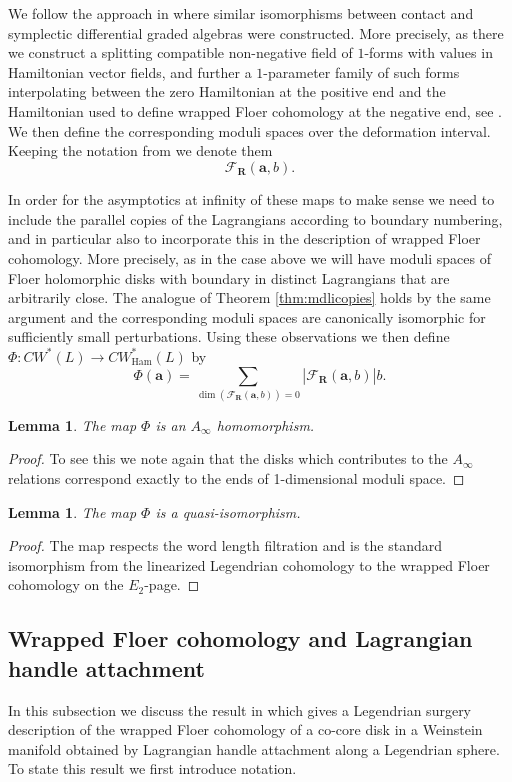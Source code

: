 \documentclass{gtpart}
\newtheorem{lem}[thm]{Lemma}
\renewcommand{\R}{\mathbf{R}}
\begin{document}
We follow the approach in \cite{EO} where similar isomorphisms between contact and
symplectic differential graded algebras were constructed. More precisely, as there we
construct a splitting compatible non-negative field of $1$-forms with values in Hamiltonian vector
fields, and further a $1$-parameter family of such forms interpolating between the zero Hamiltonian
at the positive end and the Hamiltonian used to define wrapped Floer cohomology at the negative end, see \cite[Section 2]{EO}. We then define the corresponding moduli spaces over the deformation interval. Keeping the notation from \cite{EO} we denote them
\[ 
\mathcal{F}_{\R}(\mathbf{a},b).
\]

In order for the asymptotics at infinity of these maps to make sense we need to include the
parallel copies of the Lagrangians according to boundary numbering, and in particular also to
incorporate this in the description of wrapped Floer cohomology. More precisely, as in the case above we will have moduli spaces of Floer holomorphic disks with boundary in distinct Lagrangians that are arbitrarily close. The analogue of Theorem \ref{thm:mdlicopies} holds by the same argument and the corresponding moduli spaces are canonically isomorphic for sufficiently small perturbations. Using these observations we then define $\Phi\colon CW^{\ast}(L)\to CW^{\ast}_{\mathrm{Ham}}(L)$ by
\[ 
\Phi(\mathbf{a})=\sum_{\dim(\mathcal{F}_{\R}(\mathbf{a},b))=0}|\mathcal{F}_{\R}(\mathbf{a},b)|b.
\]
\begin{lem}
The map $\Phi$ is an $A_{\infty}$ homomorphism.
\end{lem}

\begin{proof}
To see this we note again that the disks which contributes to the $A_{\infty}$ relations correspond exactly to the ends of 1-dimensional moduli space.
\end{proof}

\begin{lem}
The map $\Phi$ is a quasi-isomorphism.
\end{lem}

\begin{proof}
The map respects the word length filtration and is the standard isomorphism from the linearized Legendrian cohomology to the wrapped Floer cohomology on the $E_2$-page.
\end{proof}


\subsection{Wrapped Floer cohomology and Lagrangian handle attachment}\label{ssec:CWBEE}
In this subsection we discuss the result in \cite{BEE} which gives a Legendrian surgery description of the wrapped Floer cohomology of a co-core disk in a Weinstein manifold obtained by Lagrangian handle attachment along a Legendrian sphere. To state this result we first introduce notation. 
\end{document}
